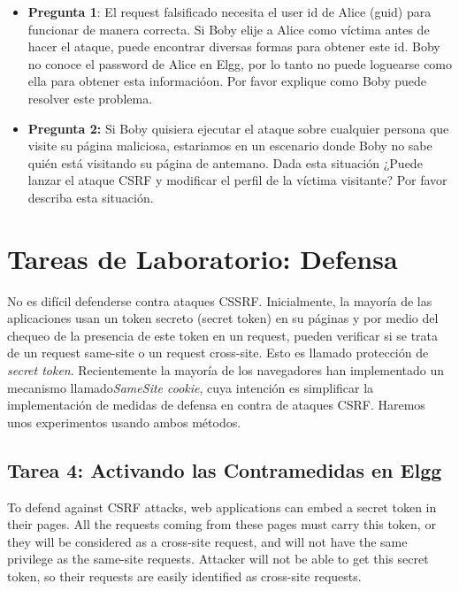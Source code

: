 \begin{itemize}
   \item \textbf{Pregunta 1}: El request falsificado necesita el user id de Alice (guid) para funcionar de manera correcta. Si Boby elije a Alice como víctima antes de hacer el ataque, puede encontrar diversas formas para obtener este id. Boby no conoce el password de Alice en Elgg, por lo tanto no puede loguearse como ella para obtener esta informacióon. Por favor explique como Boby puede resolver este problema.

   \item \textbf{Pregunta 2:} Si Boby quisiera ejecutar el ataque sobre cualquier persona que visite su página maliciosa, estariamos en un escenario donde Boby no sabe quién está visitando su página de antemano. Dada esta situación ¿Puede lanzar el ataque CSRF y modificar el perfil de la víctima visitante? Por favor describa esta situación.
\end{itemize}


\section{Tareas de Laboratorio: Defensa} 

No es difícil defenderse contra ataques CSSRF. Inicialmente, la mayoría de las aplicaciones usan un token secreto (secret token) en su páginas y por medio del chequeo de la presencia de este token en un request, pueden verificar si se trata de un request same-site o un request cross-site. Esto es llamado protección de  \textit{secret token}.
Recientemente la mayoría de los navegadores han implementado un mecanismo llamado\textit{SameSite cookie}, cuya intención es simplificar la implementación de medidas de defensa en contra de ataques CSRF.
Haremos unos experimentos usando ambos métodos. 


\subsection{Tarea 4: Activando las Contramedidas en Elgg} 

To defend against CSRF attacks, web applications can embed a secret token
in their pages. All the requests coming from these pages must carry this 
token, or they will be considered as a cross-site request, and will
not have the same privilege as the same-site requests. 
Attacker will not be able to get this secret token, so their requests
are easily identified as cross-site requests. 


